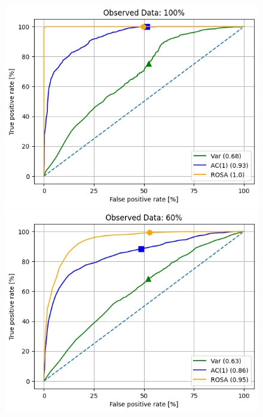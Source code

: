 \documentclass[%
thesis=student,%
coverpage=false,%
titlepage=false,%
headmarks=true, %
german,%
font=libertine, %
math=newpxtx, %
BCOR=5mm,%
coverBCOR=11mm%
]{tumbook}
\begin{document}
\begin{figure}[h!]
    \centering
    \begin{minipage}[t]{0.45\textwidth}
        \centering
        \includegraphics[width=\textwidth]{bachelor-thesis/figures/ROC_curves_100.png}
    \end{minipage}
    \hfill
    \begin{minipage}[t]{0.45\textwidth}
        \centering
        \includegraphics[width=\textwidth]{bachelor-thesis/figures/ROC_curves_60.png}
    \end{minipage}
    \vspace{0.5cm}
    

\end{figure}
\end{document}
